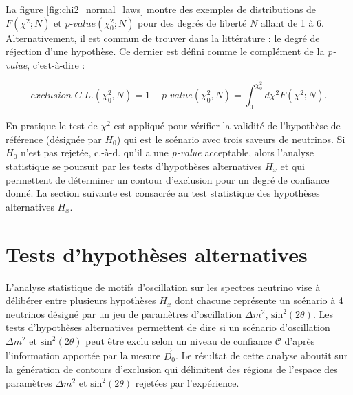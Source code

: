 La figure \ref{fig:chi2_normal_laws} montre des exemples de distributions de $F(\chi^2; N)$ et $\textit{p-value}(\chi^2_0; N)$ pour des degrés de liberté $N$ allant de 1 à 6. Alternativement, il est commun de trouver dans la littérature : le degré de réjection d'une hypothèse. Ce dernier est défini comme le complément de la \textit{p-value}, c'est-à-dire :

\begin{equation}
    \textit{exclusion C.L.}\left(\chi^2_0,N\right) = 1 - \textit{p-value}\left(\chi^2_0,N\right) = \int_{0}^{\chi^2_0} d\chi^2 F(\chi^2; N).
\end{equation}

\bigbreak

En pratique le test de $\chi^2$ est appliqué pour vérifier la validité de l'hypothèse de référence (désignée par $H_0$) qui est le scénario avec trois saveurs de neutrinos. Si $H_0$ n'est pas rejetée, c.-à-d. qu'il a une \textit{p-value} acceptable, alors l'analyse statistique se poursuit par les tests d'hypothèses alternatives $H_x$ et qui permettent de déterminer un contour d'exclusion pour un degré de confiance donné. La section suivante est consacrée au test statistique des hypothèses alternatives $H_x$.

\bigbreak


\section{Tests d'hypothèses alternatives}

L'analyse statistique de motifs d'oscillation sur les spectres neutrino vise à délibérer entre plusieurs hypothèses $H_x$ dont chacune représente un scénario à 4 neutrinos désigné par  un jeu de paramètres d'oscillation $\Delta m^2$, $\textrm{sin}^2(2\theta)$. Les tests d'hypothèses alternatives permettent de dire si un scénario d'oscillation $\Delta m^2$ et $\textrm{sin}^2(2\theta)$ peut être exclu selon un niveau de confiance $\mathcal{C}$ d'après l'information apportée par la mesure $\overrightarrow{D}_0$. Le résultat de cette analyse aboutit sur la génération de \og contours d'exclusion \fg{} qui délimitent des régions de l'espace des paramètres $\Delta m^2$ et $\textrm{sin}^2(2\theta)$ rejetées par l'expérience.\\

